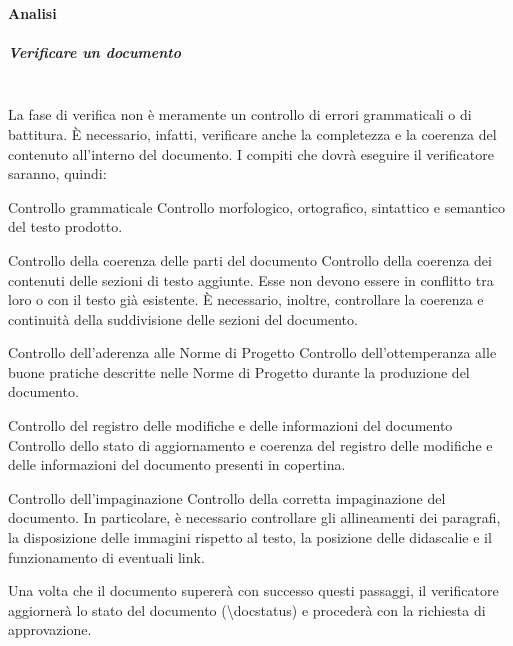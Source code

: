 \paragraph{Analisi}
\subparagraph{Verificare un documento}
\mbox{}\\
La fase di verifica non è meramente un controllo di errori grammaticali o di battitura. È necessario, infatti, verificare anche la completezza e la coerenza del contenuto all'interno del documento.
I compiti che dovrà eseguire il verificatore saranno, quindi:
\begin{enumdescript}
    \item [Controllo grammaticale] Controllo morfologico, ortografico, sintattico e semantico del testo prodotto.
    \item [Controllo della coerenza delle parti del documento] Controllo della coerenza dei contenuti delle sezioni di testo aggiunte. Esse non devono essere in conflitto tra loro o con il testo già esistente. È necessario, inoltre, controllare la coerenza e continuità della suddivisione delle sezioni del documento.
    \item [Controllo dell'aderenza alle Norme di Progetto] Controllo dell'ottemperanza alle buone pratiche descritte nelle Norme di Progetto durante la produzione del documento.
    \item [Controllo del registro delle modifiche e delle informazioni del documento] Controllo dello stato di aggiornamento e coerenza del registro delle modifiche e delle informazioni del documento presenti in copertina.
    \item [Controllo dell'impaginazione] Controllo della corretta impaginazione del documento. In particolare, è necessario controllare gli allineamenti dei paragrafi, la disposizione delle immagini rispetto al testo, la posizione delle didascalie e il funzionamento di eventuali link.
\end{enumdescript}
Una volta che il documento supererà con successo questi passaggi, il verificatore aggiornerà lo stato del documento (\textbackslash docstatus) e procederà con la richiesta di approvazione.

\setlength\extrarowheight{5pt}

